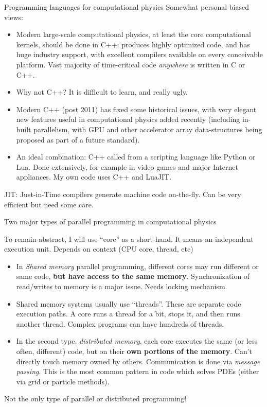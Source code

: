 \documentclass[aspectratio=169]{beamer}
\newcommand{\mypause}{\pause}
\begin{document}
\begin{frame}{Programming languages for computational physics}
  \footnotesize%
  Somewhat personal biased views:
  \begin{itemize}
  \item Modern large-scale computational physics, at least the core
    computational kernels, should be done in C++: produces highly
    optimized code, and has huge industry support, with excellent
    compilers available on every conceivable platform. Vast majority
    of time-critical code \emph{anywhere} is written in C or C++.%
    \mypause%
  \item Why not C++? It is difficult to learn, and really ugly.
    \mypause%
  \item Modern C++ (post 2011) has fixed some historical issues, with
    very elegant new features useful in computational physics added
    recently (including in-built parallelism, with GPU and other
    accelerator array data-structures being proposed as part of a
    future standard).%
    \mypause%
  \item An ideal combination: C++ called from a scripting language
    like Python or Lua. Done extensively, for example in video games
    and major Internet appliances. My own code uses C++ and LuaJIT.
  \end{itemize}
  JIT: Just-in-Time compilers generate machine code on-the-fly. Can be
  very efficient but need some care.
\end{frame}

\begin{frame}{Two major types of parallel programming in computational
    physics}

  To remain abstract, I will use ``core'' as a short-hand. It means an
  independent execution unit. Depends on context (CPU core, thread,
  etc)
  \begin{itemize}
  \item In \emph{Shared memory} parallel programming, different cores
    may run different or same code, {\bf but have access to the same
      memory}. Synchronization of read/writes to memory is a major
    issue. Needs locking mechanism.
  \item Shared memory systems usually use ``threads''. These are
    separate code execution paths. A core runs a thread for a bit,
    stops it, and then runs another thread. Complex programs can have
    hundreds of threads. %
    \mypause%
  \item In the second type, \emph{distributed memory}, each core
    executes the same (or less often, different) code, but on their
    {\bf own portions of the memory}. Can't directly touch memory
    owned by others. Communication is done via \emph{message
      passing}. This is the most common pattern in code which solves
    PDEs (either via grid or particle methods).
  \end{itemize}
  Not the only type of parallel or distributed programming!
\end{frame}
\end{document}
